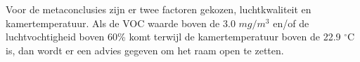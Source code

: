 Voor de metaconclusies zijn er twee factoren gekozen, luchtkwaliteit en kamertemperatuur. Als de VOC waarde boven de 3.0 \(mg/m^3\)  \cite{voc-luchtkwaliteit} en/of de luchtvochtigheid boven 60\%\cite{palonen1993effects} komt terwijl de kamertemperatuur boven de 22.9 $^{\circ}$C\cite{palonen1993effects} is, dan wordt er een advies gegeven om het raam open te zetten. 






